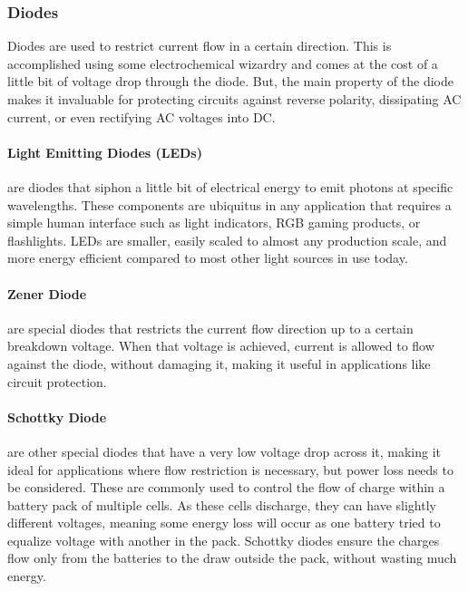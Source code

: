 
        \subsubsection*{Diodes}
        Diodes are used to restrict current flow in a certain direction.
        This is accomplished using some electrochemical wizardry and comes at the cost of a little bit of voltage drop through the diode.
        But, the main property of the diode makes it invaluable for protecting circuits against reverse polarity, dissipating AC current, or even rectifying AC voltages into DC.


        \paragraph*{Light Emitting Diodes (LEDs)} are diodes that siphon a little bit of electrical energy to emit photons at specific wavelengths.
        These components are ubiquitus in any application that requires a simple human interface such as light indicators, RGB gaming products, or flashlights.
        LEDs are smaller, easily scaled to almost any production scale, and more energy efficient compared to most other light sources in use today.


        \paragraph*{Zener Diode} are special diodes that restricts the current flow direction up to a certain breakdown voltage.
        When that voltage is achieved, current is allowed to flow against the diode, without damaging it, making it useful in applications like circuit protection.

        \paragraph*{Schottky Diode} are other special diodes that have a very low voltage drop across it, making it ideal for applications where flow restriction is necessary, but power loss needs to be considered.
        These are commonly used to control the flow of charge within a battery pack of multiple cells.
        As these cells discharge, they can have slightly different voltages, meaning some energy loss will occur as one battery tried to equalize voltage with another in the pack.
        Schottky diodes ensure the charges flow only from the batteries to the draw outside the pack, without wasting much energy.

